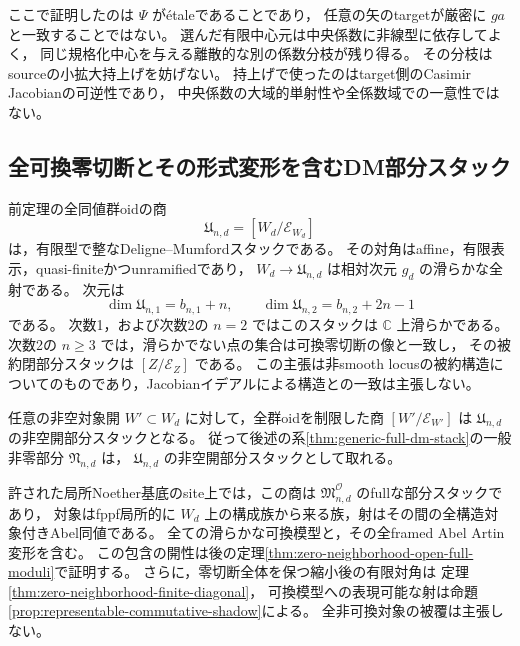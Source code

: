 \begin{remark}[座標作用への全射性は必要ない]
\label{rem:central-coefficient-branches}
ここで証明したのは $\Psi$ が\'{e}taleであることであり，
任意の矢のtargetが厳密に $ga$ と一致することではない。
選んだ有限中心元は中央係数に非線型に依存してよく，
同じ規格化中心を与える離散的な別の係数分枝が残り得る。
その分枝はsourceの小拡大持上げを妨げない。
持上げで使ったのはtarget側のCasimir Jacobianの可逆性であり，
中央係数の大域的単射性や全係数域での一意性ではない。
\end{remark}

\subsection{全可換零切断とその形式変形を含むDM部分スタック}

\begin{theorem}[全可換零切断を含む有限型DM部分スタック]
\label{thm:zero-neighborhood-full-dm}
前定理の全同値群oidの商
\[
             \mathfrak U_{n,d}
                      =[W_d/\mathcal E_{W_d}]
\]
は，有限型で整なDeligne--Mumfordスタックである。
その対角はaffine，有限表示，quasi-finiteかつunramifiedであり，
$W_d\to\mathfrak U_{n,d}$ は相対次元 $g_d$ の滑らかな全射である。
次元は
\[
 \dim\mathfrak U_{n,1}=b_{n,1}+n,
 \qquad
 \dim\mathfrak U_{n,2}=b_{n,2}+2n-1
\]
である。
次数1，および次数2の $n=2$ ではこのスタックは $\mathbb C$ 上滑らかである。
次数2の $n\ge3$ では，滑らかでない点の集合は可換零切断の像と一致し，
その被約閉部分スタックは $[Z/\mathcal E_Z]$ である。
この主張は非smooth locusの被約構造についてのものであり，Jacobianイデアルによる構造との一致は主張しない。

任意の非空対象開 $W'\subset W_d$ に対して，全群oidを制限した商
$[W'/\mathcal E_{W'}]$ は $\mathfrak U_{n,d}$ の非空開部分スタックとなる。
従って後述の系\ref{thm:generic-full-dm-stack}の一般非零部分 $\mathfrak N_{n,d}$ は，
$\mathfrak U_{n,d}$ の非空開部分スタックとして取れる。

許された局所Noether基底のsite上では，この商は
$\mathfrak M^{\mathcal O}_{n,d}$ のfullな部分スタックであり，
対象はfppf局所的に $W_d$ 上の構成族から来る族，射はその間の全構造対象付きAbel同値である。
全ての滑らかな可換模型と，その全framed Abel Artin変形を含む。
この包含の開性は後の定理\ref{thm:zero-neighborhood-open-full-moduli}で証明する。
さらに，零切断全体を保つ縮小後の有限対角は
定理\ref{thm:zero-neighborhood-finite-diagonal}，
可換模型への表現可能な射は命題\ref{prop:representable-commutative-shadow}による。
全非可換対象の被覆は主張しない。
\end{theorem}
